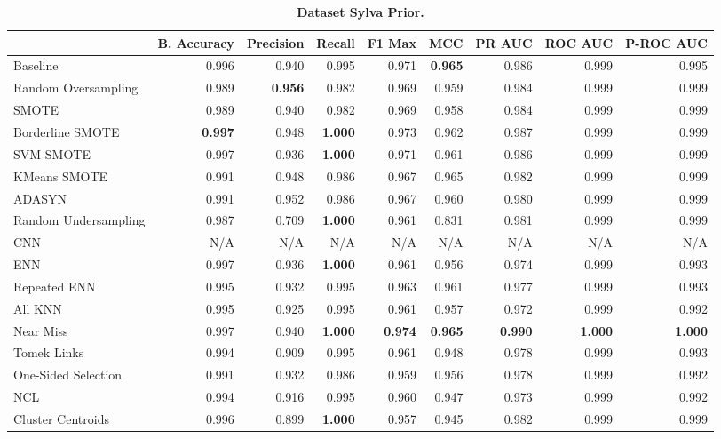 \begin{table}[H]
    \centering
    \setlength\tabcolsep{2pt}
    \begin{tabularx}{\textwidth}{lRRRRRRRR}
        & B. Accuracy & Precision & Recall & F1 Max & MCC & PR AUC & ROC AUC & P-ROC AUC \\
        \midrule
        Baseline & 0.996 & 0.940 & 0.995 & 0.971 & \textbf{0.965} & 0.986 & 0.999 & 0.995 \\
        Random Oversampling & 0.989 & \textbf{0.956} & 0.982 & 0.969 & 0.959 & 0.984 & 0.999 & 0.999 \\
        SMOTE & 0.989 & 0.940 & 0.982 & 0.969 & 0.958 & 0.984 & 0.999 & 0.999 \\
        Borderline SMOTE & \textbf{0.997} & 0.948 & \textbf{1.000} & 0.973 & 0.962 & 0.987 & 0.999 & 0.999 \\
        SVM SMOTE & 0.997 & 0.936 & \textbf{1.000} & 0.971 & 0.961 & 0.986 & 0.999 & 0.999 \\
        KMeans SMOTE & 0.991 & 0.948 & 0.986 & 0.967 & 0.965 & 0.982 & 0.999 & 0.999 \\
        ADASYN & 0.991 & 0.952 & 0.986 & 0.967 & 0.960 & 0.980 & 0.999 & 0.999 \\
        Random Undersampling & 0.987 & 0.709 & \textbf{1.000} & 0.961 & 0.831 & 0.981 & 0.999 & 0.999 \\
        CNN & N/A & N/A & N/A & N/A & N/A & N/A & N/A & N/A \\
        ENN & 0.997 & 0.936 & \textbf{1.000} & 0.961 & 0.956 & 0.974 & 0.999 & 0.993 \\
        Repeated ENN & 0.995 & 0.932 & 0.995 & 0.963 & 0.961 & 0.977 & 0.999 & 0.993 \\
        All KNN & 0.995 & 0.925 & 0.995 & 0.961 & 0.957 & 0.972 & 0.999 & 0.992 \\
        Near Miss & 0.997 & 0.940 & \textbf{1.000} & \textbf{0.974} & \textbf{0.965} & \textbf{0.990} & \textbf{1.000} & \textbf{1.000} \\
        Tomek Links & 0.994 & 0.909 & 0.995 & 0.961 & 0.948 & 0.978 & 0.999 & 0.993 \\
        One-Sided Selection & 0.991 & 0.932 & 0.986 & 0.959 & 0.956 & 0.978 & 0.999 & 0.992 \\
        NCL & 0.994 & 0.916 & 0.995 & 0.960 & 0.947 & 0.973 & 0.999 & 0.992 \\
        Cluster Centroids & 0.996 & 0.899 & \textbf{1.000} & 0.957 & 0.945 & 0.982 & 0.999 & 0.999 \\
    \end{tabularx}
    \vspace{1mm}
    \caption{\textbf{Dataset Sylva Prior.}}
\end{table}
